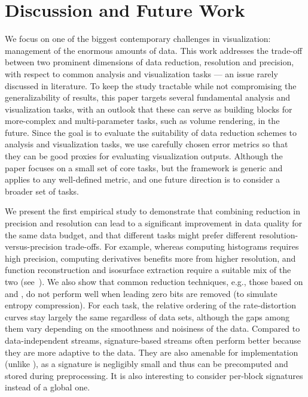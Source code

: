 \section{Discussion and Future Work}

{\color{blue}
We focus on one of the biggest contemporary challenges in visualization: management of 
the enormous amounts of data. This work addresses the trade-off between two prominent 
dimensions of data reduction, resolution and precision, with respect to 
common analysis and visualization tasks --- 
an issue rarely discussed in literature.
To keep the study tractable while not
compromising the generalizability of results, this paper targets 
several fundamental analysis and visualization tasks, with an outlook that these can serve as building blocks 
for more-complex and multi-parameter tasks, such as volume rendering, in the future.
Since the goal is to evaluate the suitability of data reduction schemes to analysis and 
visualization tasks, we use carefully chosen error metrics 
so that they can be good
proxies for evaluating visualization outputs. Although the paper focuses on a small set of core tasks, but
the framework is generic and applies to any well-defined metric, and one future direction is to
consider a broader set of tasks.}

We present the first empirical study to demonstrate that combining reduction in precision and
resolution can lead to a significant improvement in data quality for the same data budget, and that
different tasks might prefer different resolution-versus-precision trade-offs. For example, whereas
computing histograms requires high precision, computing derivatives benefits more from higher
resolution, and function reconstruction and isosurface extraction require a suitable mix of the two
(see~). We also show that common reduction techniques, e.g., those based on
\slvl and \smag, do not perform well when leading zero bits are removed (to simulate entropy
compression). {\color{red}For each task, the relative ordering of the rate-distortion curves stay
largely the same regardless of data sets, although the gaps among them vary depending on the
smoothness and noisiness of the data. Compared to data-independent streams, signature-based streams
often perform better because they are more adaptive to the data. They are also amenable for
implementation (unlike \sopt), as a signature is negligibly small and thus can be precomputed and
stored during preprocessing. It is also interesting to consider per-block signatures instead of a
global one.}


